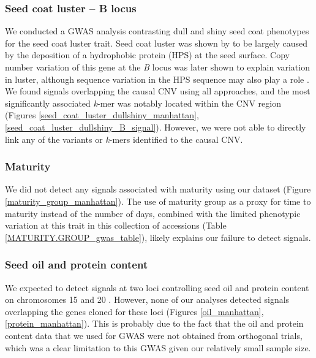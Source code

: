\subsubsection*{Seed coat luster -- B locus}
\label{sv-gwas-main-results-seed-coat-luster-b}

We conducted a GWAS analysis contrasting dull and shiny seed coat phenotypes
for the seed coat luster trait. Seed coat luster was shown by \cite{gijzen1999}
to be largely caused by the deposition of a hydrophobic protein (HPS)
at the seed surface. Copy number variation of this gene at the \textit{B}
locus was later shown to explain variation in luster, although sequence
variation in the HPS sequence may also play a role \citep{gijzen2006}.
We found signals overlapping the causal CNV using all approaches, and the
most significantly associated \textit{k}-mer was notably located
within the CNV region (Figures \ref{seed_coat_luster_dullshiny_manhattan},
\ref{seed_coat_luster_dullshiny_B_signal}). However, we were not able
to directly link any of the variants or \textit{k}-mers identified to the causal
CNV.

\subsubsection*{Maturity}
\label{sv-gwas-main-results-maturity}

We did not detect any signals associated with maturity using our dataset
(Figure \ref{maturity_group_manhattan}). The use of maturity group as a proxy
for time to maturity instead of the number of days, combined with the limited
phenotypic variation at this trait in this collection of accessions (Table
\ref{MATURITY.GROUP_gwas_table}), likely explains our failure to detect
signals.

\subsubsection*{Seed oil and protein content}
\label{sv-gwas-main-results-oil-protein}

We expected to detect signals at two loci controlling seed oil and protein
content on chromosomes 15 and 20 \citep{bandillo2015}. However, none of our
analyses detected signals overlapping the genes cloned for these loci (Figures
\ref{oil_manhattan}, \ref{protein_manhattan}). This is probably due to the fact
that the oil and protein content data that we used for GWAS were not obtained
from orthogonal trials, which was a clear limitation to this GWAS given our
relatively small sample size. 



